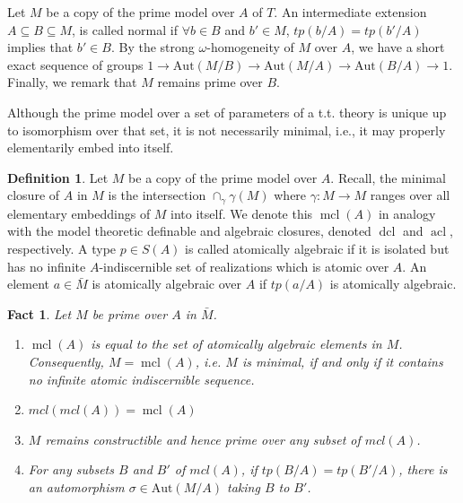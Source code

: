 \documentclass{amsart}
\newtheorem{fact}[theorem]{Fact}
\theoremstyle{definition}
\newtheorem{definition}[theorem]{Definition}
\theoremstyle{remark}
\newtheorem{example}[theorem]{Example}
\numberwithin{equation}{section}
\def \tp {tp}
\def \aut {\text{Aut}}
\def \mcl {\operatorname{mcl}}
\def \acl {\operatorname{acl}}
\def \dcl {\operatorname{dcl}}
\begin{document}
Let $M$ be a copy of the prime model over $A$ of $T$. An intermediate extension $A \subseteq B \subseteq M$, is called normal if $\forall b \in B$ and $b' \in M$, $\tp(b/A) = \tp(b'/A)$ implies that $b' \in B$. By the strong $\omega$-homogeneity of $M$ over $A$, we have a short exact sequence of groups $1 \to \aut(M/B) \to \aut(M/A) \to \aut(B/A) \to 1$. Finally, we remark that $M$ remains prime over $B$. 

Although the prime model over a set of parameters of a t.t. theory is unique up to isomorphism over that set, it is not necessarily minimal, i.e., it may properly elementarily embed into itself. 

\begin{definition}\cite{PoizatPrime}
    Let $M$ be a copy of the prime model over $A$. Recall, the minimal closure of $A$ in $M$ is the intersection $\cap_{\gamma}\gamma(M)$ where $\gamma:M \to M$ ranges over all elementary embeddings of $M$ into itself.  We denote this $\mcl(A)$ in analogy with the model theoretic definable and algebraic closures, denoted $\dcl$ and $\acl$, respectively. A type $p \in S(A)$ is called atomically algebraic if it is isolated but has no infinite $A$-indiscernible set of realizations which is atomic over $A$. An element $a \in \bar{M}$ is atomically algebraic over $A$ if $\tp(a/A)$ is atomically algebraic. 
\end{definition}

\begin{fact}\cite{PoizatPrime}\label{fact: mcl}
    Let $M$ be prime over $A$ in $\bar{M}$. 
    \begin{enumerate}
        \item $\mcl(A)$ is equal to the set of atomically algebraic elements in $M$. Consequently, $M = \mcl(A)$, i.e. $M$ is minimal, if and only if it contains no infinite atomic indiscernible sequence.
        \item $mcl(mcl(A)) = \mcl(A)$
        \item $M$ remains constructible and hence prime over any subset of $mcl(A)$. 
        \item For any subsets $B$ and $B'$ of $mcl(A)$, if $tp(B/A) = tp(B'/A)$, there is an automorphism $\sigma \in \aut(M/A)$ taking $B$ to $B'$.
    \end{enumerate}
\end{fact}

\end{document}
